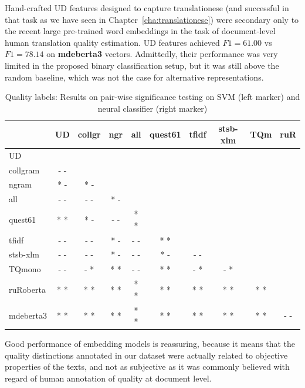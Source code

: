 Hand-crafted UD features designed to capture translationese (and successful in that task as we have seen in Chapter~\ref{cha:translationese}) were secondary only to the recent large pre-trained word embeddings in the task of document-level human translation quality estimation. UD features achieved $F1=61.00$ vs $F1=78.14$ on \textbf{mdeberta3} vectors.
Admittedly, their performance was very limited in the proposed binary classification setup, but it was still above the random baseline, which was not the case for alternative representations. 
\begin{table}[H]
		\centering
	\begin{tabular}{l|ccccccccc}
		\toprule
						& UD  & collgr & ngr & all & quest61  & tfidf & stsb-xlm & TQm & ruR \\
		\midrule
		UD              &     &      &    &         &         &       &  &   & \\
		collgram        & - - &      &    &         &         &       &  &  & \\
		ngram           & * - & * -  &    &         &         &       &   &    & \\
		all             & - - & - -  & * - &        &         &       &    & & \\
		quest61         & * * & * -  & - - & * *    &         &       &  & &  \\
		tfidf           & - - & - -  & * - & - -    & * *     &       &    &  &  \\
		stsb-xlm        & - - & - -  & * - & - -    & * -     & - -   &      &    &    \\
		TQmono          & - - & - *  & * * & - -    & * *     & - *   & - *  &      & \\
		ruRoberta       & * * & * *  & * * & * *    & * *     & * *   & * *  & * *  &   \\
		mdeberta3       & * * & * *  & * * & * *    & * *     & * *   & * *  & * *  & - - \\           
			\bottomrule
	\end{tabular}
	\caption{\label{tab:sign_tests_qua_labels}Quality labels: Results on pair-wise significance testing on SVM (left marker) and neural classifier (right marker)}
\end{table}

Good performance of embedding models is reassuring, because it means that the quality distinctions annotated in our dataset were actually related to objective properties of the texts, and not as subjective as it was commonly believed with regard of human annotation of quality at document level. 

